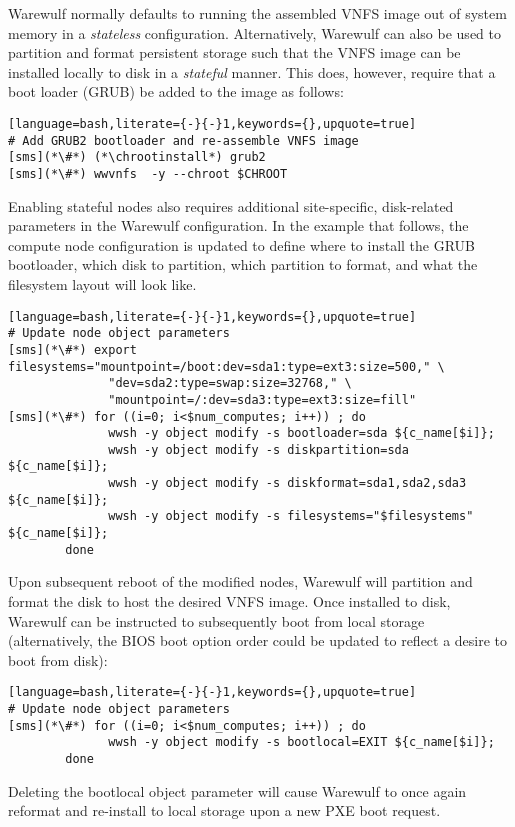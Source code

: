 Warewulf normally defaults to running the assembled VNFS image out of system
memory in a {\em stateless} configuration. Alternatively, Warewulf can also be
used to partition and format persistent storage such that the VNFS image can be
installed locally to disk in a {\em stateful} manner.  This does, however,
require that a boot loader (GRUB) be added to the image as follows:

\begin{lstlisting}[language=bash,literate={-}{-}1,keywords={},upquote=true]
# Add GRUB2 bootloader and re-assemble VNFS image
[sms](*\#*) (*\chrootinstall*) grub2
[sms](*\#*) wwvnfs  -y --chroot $CHROOT
\end{lstlisting}

\noindent Enabling stateful nodes also requires additional site-specific, disk-related
parameters in the Warewulf configuration. In the example that follows, the
compute node configuration is updated to define where to install the GRUB
bootloader, which disk to partition, which partition to format, and what the
filesystem layout will look like.

\begin{lstlisting}[language=bash,literate={-}{-}1,keywords={},upquote=true]
# Update node object parameters
[sms](*\#*) export filesystems="mountpoint=/boot:dev=sda1:type=ext3:size=500," \
              "dev=sda2:type=swap:size=32768," \
              "mountpoint=/:dev=sda3:type=ext3:size=fill"
[sms](*\#*) for ((i=0; i<$num_computes; i++)) ; do 
              wwsh -y object modify -s bootloader=sda ${c_name[$i]};
              wwsh -y object modify -s diskpartition=sda ${c_name[$i]};
              wwsh -y object modify -s diskformat=sda1,sda2,sda3 ${c_name[$i]};
              wwsh -y object modify -s filesystems="$filesystems" ${c_name[$i]};
        done
\end{lstlisting}

\noindent Upon subsequent reboot of the modified nodes, Warewulf will partition
and format the disk to host the desired VNFS image.  Once installed to disk,
Warewulf can be instructed to subsequently boot from local storage
(alternatively, the BIOS boot option order could be updated to reflect a desire
to boot from disk):

\begin{lstlisting}[language=bash,literate={-}{-}1,keywords={},upquote=true]
# Update node object parameters
[sms](*\#*) for ((i=0; i<$num_computes; i++)) ; do 
              wwsh -y object modify -s bootlocal=EXIT ${c_name[$i]};
        done
\end{lstlisting}


\noindent Deleting the bootlocal object parameter will cause Warewulf to once
again reformat and re-install to local storage upon a new PXE boot request.
